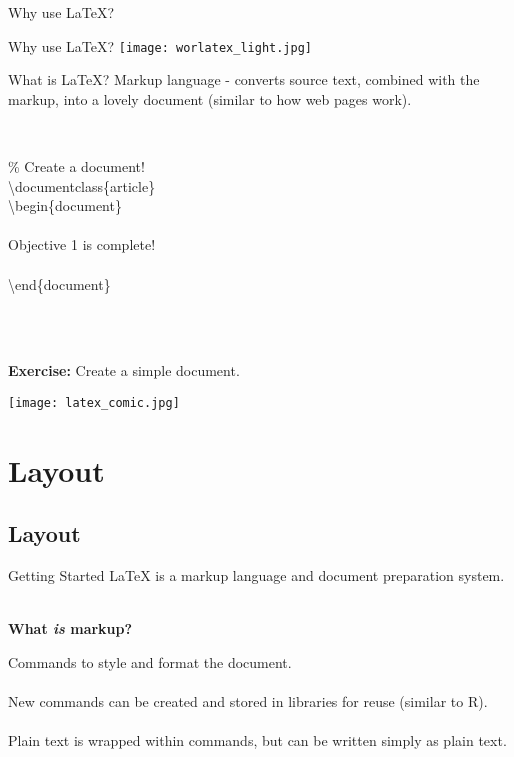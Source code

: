 \documentclass[xcolor=dvipsnames]{beamer}
\begin{document}
\begin{frame}{\LARGE{Why use \LaTeX?}}
\centering
{}
\end{frame}

\begin{frame}{\LARGE{Why use \LaTeX?}}
\centering
\texttt{[image: worlatex\_light.jpg]}
\end{frame}

\begin{frame}{\LARGE{What is \LaTeX?}}
Markup language - converts source text, combined with the markup, into a lovely document (similar to how web pages work).\\~\\
\begin{columns}
\begin{column}{.5\textwidth}
\% Create a document!\\
\textbackslash documentclass\{article\}\\
\textbackslash begin\{document\}\\~\\
Objective 1 is complete!\\~\\
\textbackslash end\{document\}
\end{column}
\begin{column}{.3\textwidth}
\end{column}
\end{columns}
\pause
~\\~\\ \Large{\textbf{Exercise:} Create a simple document.}
\end{frame}

\begin{frame}{}

\centering
\texttt{[image: latex\_comic.jpg]}
\end{frame}


\section{Layout}
\subsection{Layout}


\begin{frame}{\LARGE{Getting Started}}
LaTeX is a markup language and document preparation system.\\~\\
\begin{center}
	\textbf{What \textit{is} markup?}
\end{center}
Commands to style and format the document. \\~\\
New commands can be created and stored in libraries for reuse (similar to R).\\~\\
Plain text is wrapped within commands, but can be written simply as plain text.

\end{frame}
\end{document}
